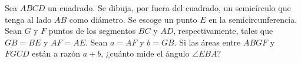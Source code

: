 Sea $ABCD$ un cuadrado. Se dibuja, por fuera del cuadrado, un semicírculo que tenga al lado $AB$ como diámetro. Se escoge un punto $E$ en la semicircunferencia. Sean $G$ y $F$ puntos de los segmentos $BC$ y $AD$, respectivamente, tales que $GB=BE$ y $AF=AE$. Sean $a=AF$ y $b=GB$. Si las áreas entre $ABGF$ y $FGCD$ están a razón $a+b$, ¿cuánto mide el ángulo $\angle EBA$?